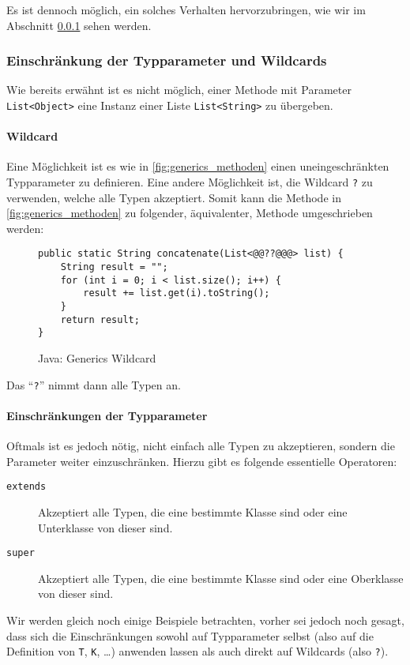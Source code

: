 		Es ist dennoch möglich, ein solches Verhalten hervorzubringen, wie wir im Abschnitt \ref{sec:generics_restriction} sehen werden.
	
	\subsubsection{Einschränkung der Typparameter und Wildcards}
		\label{sec:generics_restriction}
	
		Wie bereits erwähnt ist es nicht möglich, einer Methode mit Parameter \texttt{List<Object>} eine Instanz einer Liste \texttt{List<String>} zu übergeben.
		
		\paragraph{Wildcard}
			Eine Möglichkeit ist es wie in \ref{fig:generics_methoden} einen uneingeschränkten Typparameter zu definieren. Eine andere Möglichkeit ist, die Wildcard \texttt{?} zu verwenden, welche alle Typen akzeptiert. Somit kann die Methode in \ref{fig:generics_methoden} zu folgender, äquivalenter, Methode umgeschrieben werden:
			\begin{figure}[H]
				\centering
				\begin{lstlisting}
public static String concatenate(List<@@??@@@> list) {
	String result = "";
	for (int i = 0; i < list.size(); i++) {
		result += list.get(i).toString();
	}
	return result;
}
				\end{lstlisting}
				\caption{Java: Generics Wildcard}
			\end{figure}
			Das \enquote{\texttt{?}} nimmt dann alle Typen an.
		
		\paragraph{Einschränkungen der Typparameter}
			Oftmals ist es jedoch nötig, nicht einfach alle Typen zu akzeptieren, sondern die Parameter weiter einzuschränken. Hierzu gibt es folgende essentielle Operatoren:
			\begin{description}
				\item[\texttt{extends}] Akzeptiert alle Typen, die eine bestimmte Klasse sind oder eine Unterklasse von dieser sind.
				\item[\texttt{super}] Akzeptiert alle Typen, die eine bestimmte Klasse sind oder eine Oberklasse von dieser sind.
			\end{description}
			Wir werden gleich noch einige Beispiele betrachten, vorher sei jedoch noch gesagt, dass sich die Einschränkungen sowohl auf Typparameter selbst (also auf die Definition von \texttt{T}, \texttt{K}, \dots) anwenden lassen als auch direkt auf Wildcards (also \texttt{?}).
			
